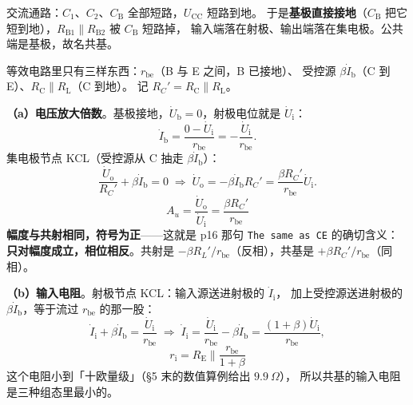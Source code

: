 \documentclass[11pt]{ctexart}
\begin{document}


交流通路：$C_1$、$C_2$、$C_{\mathrm{B}}$ 全部短路，$U_{\mathrm{CC}}$ 短路到地。
于是\textbf{基极直接接地}（$C_{\mathrm{B}}$ 把它短到地），$R_{\mathrm{B1}}\parallel R_{\mathrm{B2}}$ 被 $C_{\mathrm{B}}$ 短路掉，
输入端落在射极、输出端落在集电极。公共端是基极，故名共基。

等效电路里只有三样东西：$r_{\mathrm{be}}$（B 与 E 之间，B 已接地）、
受控源 $\beta\dot I_{\mathrm{b}}$（C 到 E）、$R_{\mathrm{C}}\parallel R_{\mathrm{L}}$（C 到地）。
记 $R_C'=R_{\mathrm{C}}\parallel R_{\mathrm{L}}$。

\textbf{（a）电压放大倍数}。基极接地，$\dot U_{\mathrm{b}}=0$，射极电位就是 $\dot U_{\mathrm{i}}$：
\[
\dot I_{\mathrm{b}}=\frac{0-\dot U_{\mathrm{i}}}{r_{\mathrm{be}}}=-\frac{\dot U_{\mathrm{i}}}{r_{\mathrm{be}}} .
\]
集电极节点 KCL（受控源从 C 抽走 $\beta\dot I_{\mathrm{b}}$）：
\[
\frac{\dot U_{\mathrm{o}}}{R_C'}+\beta\dot I_{\mathrm{b}}=0
\;\Longrightarrow\;
\dot U_{\mathrm{o}}=-\beta\dot I_{\mathrm{b}}R_C'=\frac{\beta R_C'}{r_{\mathrm{be}}}\dot U_{\mathrm{i}} .
\]
\[
\boxed{\;A_u=\frac{\dot U_{\mathrm{o}}}{\dot U_{\mathrm{i}}}=\frac{\beta R_C'}{r_{\mathrm{be}}}\;}
\]
\textbf{幅度与共射相同，符号为正}——这就是 p16 那句 \texttt{The same as CE} 的确切含义：
\textbf{只对幅度成立，相位相反}。共射是 $-\beta R_L'/r_{\mathrm{be}}$（反相），共基是 $+\beta R_C'/r_{\mathrm{be}}$（同相）。


\textbf{（b）输入电阻}。射极节点 KCL：输入源送进射极的 $\dot I_{\mathrm{i}}$，
加上受控源送进射极的 $\beta\dot I_{\mathrm{b}}$，等于流过 $r_{\mathrm{be}}$ 的那一股：
\[
\dot I_{\mathrm{i}}+\beta\dot I_{\mathrm{b}}=\frac{\dot U_{\mathrm{i}}}{r_{\mathrm{be}}}
\;\Longrightarrow\;
\dot I_{\mathrm{i}}=\frac{\dot U_{\mathrm{i}}}{r_{\mathrm{be}}}-\beta\dot I_{\mathrm{b}}
=\frac{(1+\beta)\dot U_{\mathrm{i}}}{r_{\mathrm{be}}},
\]
\[
\boxed{\;r_{\mathrm{i}}=R_{\mathrm{E}}\parallel\frac{r_{\mathrm{be}}}{1+\beta}\;}
\]
这个电阻小到「十欧量级」（§5 末的数值算例给出 $9.9\ \Omega$），
所以共基的输入电阻是三种组态里最小的。
\end{document}
